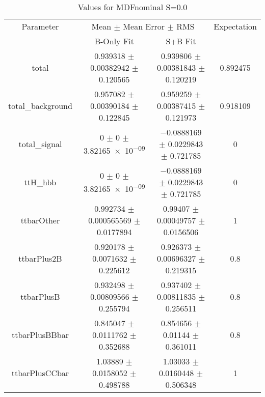 \begin{table}
\centering
\caption{Values for MDFnominal S=0.0}
\begin{tabular}{cccc}
\toprule
Parameter & \multicolumn{2}{c}{Mean $\pm$ Mean Error $\pm$ RMS} & Expectation\\
 & B-Only Fit & S+B Fit & \\
\midrule
total & \num{0.939318} $\pm$ \num{0.00382942} $\pm$ \num{0.120565} & \num{0.939806} $\pm$ \num{0.00381843} $\pm$ \num{0.120219} & \num{0.892475}\\
total\_background & \num{0.957082} $\pm$ \num{0.00390184} $\pm$ \num{0.122845} & \num{0.959259} $\pm$ \num{0.00387415} $\pm$ \num{0.121973} & \num{0.918109}\\
total\_signal & \num{0} $\pm$ \num{0} $\pm$ \num{3.82165e-09} & \num{-0.0888169} $\pm$ \num{0.0229843} $\pm$ \num{0.721785} & \num{0}\\
ttH\_hbb & \num{0} $\pm$ \num{0} $\pm$ \num{3.82165e-09} & \num{-0.0888169} $\pm$ \num{0.0229843} $\pm$ \num{0.721785} & \num{0}\\
ttbarOther & \num{0.992734} $\pm$ \num{0.000565569} $\pm$ \num{0.0177894} & \num{0.99407} $\pm$ \num{0.00049757} $\pm$ \num{0.0156506} & \num{1}\\
ttbarPlus2B & \num{0.920178} $\pm$ \num{0.0071632} $\pm$ \num{0.225612} & \num{0.926373} $\pm$ \num{0.00696327} $\pm$ \num{0.219315} & \num{0.8}\\
ttbarPlusB & \num{0.932498} $\pm$ \num{0.00809566} $\pm$ \num{0.255794} & \num{0.937402} $\pm$ \num{0.00811835} $\pm$ \num{0.256511} & \num{0.8}\\
ttbarPlusBBbar & \num{0.845047} $\pm$ \num{0.0111762} $\pm$ \num{0.352688} & \num{0.854656} $\pm$ \num{0.01144} $\pm$ \num{0.361011} & \num{0.8}\\
ttbarPlusCCbar & \num{1.03889} $\pm$ \num{0.0158052} $\pm$ \num{0.498788} & \num{1.03033} $\pm$ \num{0.0160448} $\pm$ \num{0.506348} & \num{1}\\
\bottomrule
\end{tabular}
\end{table}